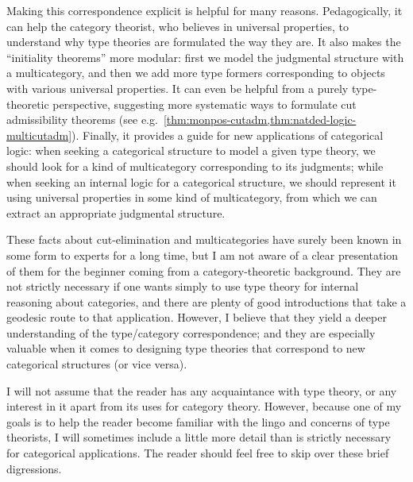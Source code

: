 Making this correspondence explicit is helpful for many reasons.
Pedagogically, it can help the category theorist, who believes in universal properties, to understand why type theories are formulated the way they are.
It also makes the ``initiality theorems'' more modular: first we model the judgmental structure with a multicategory, and then we add more type formers corresponding to objects with various universal properties.
It can even be helpful from a purely type-theoretic perspective, suggesting more systematic ways to formulate cut admissibility theorems (see e.g.\ \cref{thm:monpos-cutadm,thm:natded-logic-multicutadm}). %
Finally, it provides a guide for new applications of categorical logic: when seeking a categorical structure to model a given type theory, we should look for a kind of multicategory corresponding to its judgments; while when seeking an internal logic for a categorical structure, we should represent it using universal properties in some kind of multicategory, from which we can extract an appropriate judgmental structure.

These facts about cut-elimination and multicategories have surely been known in some form to experts for a long time, but I am not aware of a clear presentation of them for the beginner coming from a category-theoretic background.
They are not strictly necessary if one wants simply to use type theory for internal reasoning about categories, and there are plenty of good introductions that take a geodesic route to that application.
However, I believe that they yield a deeper understanding of the type/category correspondence; and they are especially valuable when it comes to designing type theories that correspond to new categorical structures (or vice versa).

I will not assume that the reader has any acquaintance with type theory, or any interest in it apart from its uses for category theory.
However, because one of my goals is to help the reader become familiar with the lingo and concerns of type theorists, I will sometimes include a little more detail than is strictly necessary for categorical applications.
The reader should feel free to skip over these brief digressions.

